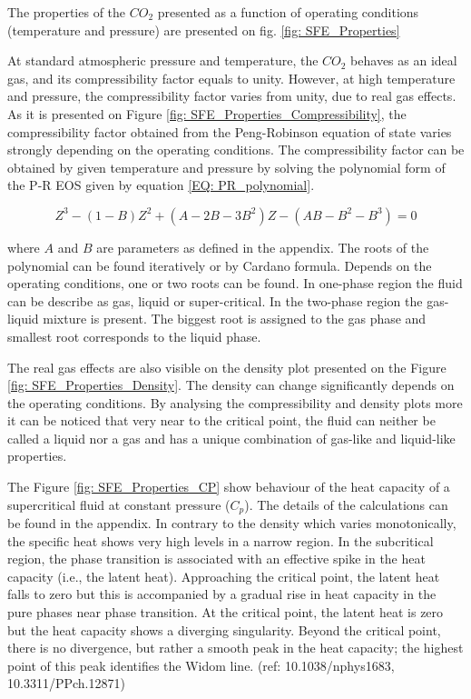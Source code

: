 \documentclass[../Article_Model_Parameters.tex]{subfiles}
\begin{document}
    The properties of the $CO_2$ presented as a function of operating conditions (temperature and pressure) are presented on fig. \ref{fig: SFE_Properties}    
    
    At standard atmospheric pressure and temperature, the $CO_2$ behaves as an ideal gas, and its compressibility factor equals to unity.  However, at high temperature and pressure, the compressibility factor varies from unity, due to real gas effects. As it is presented on Figure \ref{fig: SFE_Properties_Compressibility}, the compressibility factor obtained from the Peng-Robinson equation of state varies strongly depending on the operating conditions. The compressibility factor can be obtained by given temperature and pressure by solving the polynomial form of the P-R EOS given by equation \ref{EQ: PR_polynomial}.

    {\footnotesize
    \begin{equation}
        Z^3 - (1-B)Z^2+(A-2B-3B^2)Z -(AB-B^2-B^3) = 0
        \label{EQ: PR_polynomial}
    \end{equation}
    }

    where $A$ and $B$ are parameters as defined in the appendix. The roots of the polynomial can be found iteratively or by Cardano formula. Depends on the operating conditions, one or two roots can be found. In one-phase region the fluid can be describe as gas, liquid or super-critical. In the two-phase region the gas-liquid mixture is present. The biggest root is assigned to the gas phase and smallest root corresponds to the liquid phase.

    The real gas effects are also visible on the density plot presented on the Figure \ref{fig: SFE_Properties_Density}. The density can change significantly depends on the operating conditions. 
    By analysing the compressibility and density plots more it can be noticed that very near to the critical point, the fluid can neither be called a liquid nor a gas and has a unique combination of gas-like and liquid-like properties. 

    The Figure \ref{fig: SFE_Properties_CP} show behaviour of the heat capacity of a supercritical fluid at constant pressure ($C_p$). The details of the calculations can be found in the appendix. In contrary to the density which varies monotonically, the specific heat shows very high levels in a narrow region. In the subcritical region, the phase transition is associated with an effective spike in the heat capacity (i.e., the latent heat). Approaching the critical point, the latent heat falls to zero but this is accompanied by a gradual rise in heat capacity in the pure phases near phase transition. At the critical point, the latent heat is zero but the heat capacity shows a diverging singularity. Beyond the critical point, there is no divergence, but rather a smooth peak in the heat capacity; the highest point of this peak identifies the Widom line. (ref: 10.1038/nphys1683, 10.3311/PPch.12871)
\end{document}
